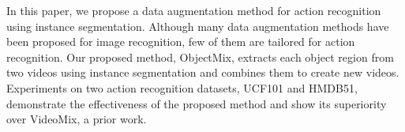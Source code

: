In this paper, we propose a data augmentation method for action recognition using instance segmentation.
Although many data augmentation methods have been proposed for image recognition, few of them are tailored for action recognition.
Our proposed method, ObjectMix, extracts each object region from two videos using instance segmentation
and combines them to create new videos.
Experiments on two action recognition datasets, UCF101 and HMDB51, demonstrate the effectiveness of the proposed method
and show its superiority over VideoMix, a prior work.
